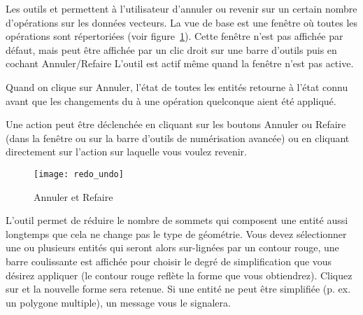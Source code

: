 Les outils  et  permettent à l'utilisateur d'annuler ou revenir sur un certain nombre d'opérations sur les données vecteurs. La vue de base est une fenêtre où toutes les opérations sont répertoriées (voir figure~\ref{fig:vector_redoundo}). Cette fenêtre n'est pas affichée par défaut, mais peut être affichée par un clic droit sur une barre d'outils puis en cochant Annuler/Refaire L'outil est actif même quand la fenêtre n'est pas active.
\par
Quand on clique sur Annuler, l'état de toutes les entités retourne à l'état connu avant que les changements du à une opération quelconque aient été appliqué.
\par
Une action peut être déclenchée en cliquant sur les boutons Annuler ou Refaire (dans la fenêtre ou sur la barre d'outils de numérisation avancée) ou en cliquant directement sur l'action sur laquelle vous voulez revenir.

\begin{figure}[ht]
   \begin{center}   
   \texttt{[image: redo\_undo]}
   \caption{Annuler et Refaire \nixcaption}\label{fig:vector_redoundo}
\end{center}
\end{figure}


L'outil  permet de réduire le nombre de sommets qui composent une entité aussi longtemps que cela ne change pas le type de géométrie. Vous devez sélectionner une ou plusieurs entités qui seront alors sur-lignées par un contour rouge, une barre coulissante est affichée pour choisir le degré de simplification que vous désirez appliquer (le contour rouge reflète la forme que vous obtiendrez). Cliquez sur  et la nouvelle forme sera retenue. Si une entité ne peut être simplifiée (p. ex. un polygone multiple), un message vous le signalera.

